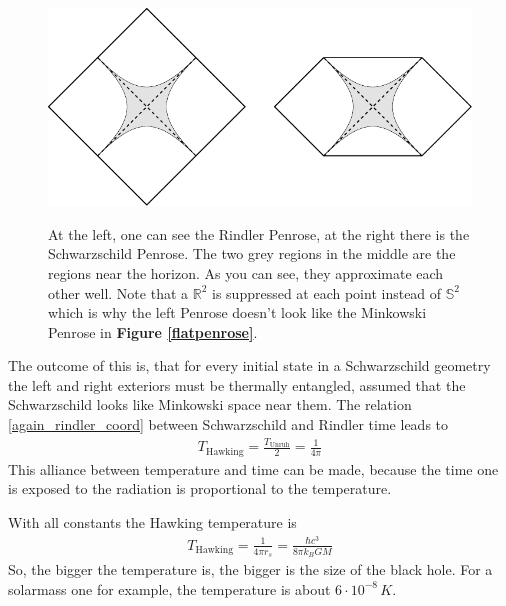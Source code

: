 \begin{figure}[tb]
	\begin{center}
		\includegraphics[scale=1]{rindsch} \label{approximation}
		\caption{At the left, one can see the Rindler Penrose, at the right there is the Schwarzschild Penrose. The two grey regions in the middle are the regions near the horizon. As you can see, they approximate each other well. Note that a $\mathds{R}^2$ is suppressed at each point instead of $\mathds{S}^2$ which is why the left Penrose doesn't look like the Minkowski Penrose in \textbf{Figure \ref{flatpenrose}}.}\label{approximation}
	\end{center}
\end{figure}
The outcome of this is, that for every initial state in a Schwarzschild geometry the left and right exteriors must be thermally entangled, assumed that the Schwarzschild looks like Minkowski space near them. 
The relation \eqref{again_rindler_coord} between Schwarzschild and Rindler time leads to 
	\begin{align}
		T_{\text{Hawking}} = \frac{T_{\text{Unruh}}}{2} = \frac{1}{4\pi}
	\end{align}
This alliance between temperature and time can be made, because the time one is exposed to the radiation is proportional to the temperature. 

With all constants the Hawking temperature is
	\begin{align}
		T_{\text{Hawking}} = \frac{1}{4\pi r_s} = \frac{\hbar c^3}{8 \pi k_B GM}
	\end{align}
So, the bigger the temperature is, the bigger is the size of the black hole. For a solarmass one for example, the temperature is about $6 \cdot 10^{-8} \,\unit{K}$. 